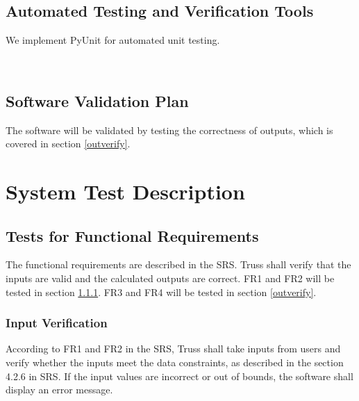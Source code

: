 \documentclass[12pt, titlepage]{article}
\begin{document}
\subsection{Automated Testing and Verification Tools} \label{autotool}
We implement PyUnit for automated unit testing. 

\\

\subsection{Software Validation Plan} \label{sftwareplan}
The software will be validated by testing the correctness of outputs, which is 
covered in section \ref{outverify}.

\section{System Test Description} \label{sysdescript}
	
\subsection{Tests for Functional Requirements} \label{testfr}
The functional requirements are described in the SRS. Truss shall verify that 
the inputs are valid and the calculated outputs are correct.
FR1 and FR2 will be tested in section \ref{inverify}. FR3 and FR4 will be 
tested in section \ref{outverify}.

\subsubsection{Input Verification} \label{inverify}
According to FR1 and FR2 in the SRS, Truss shall take inputs from users and 
verify whether the inputs meet the data constraints, as described in the 
section 4.2.6 in SRS. If the input values are incorrect or out of bounds, the 
software shall display an error message.
		
\end{document}
